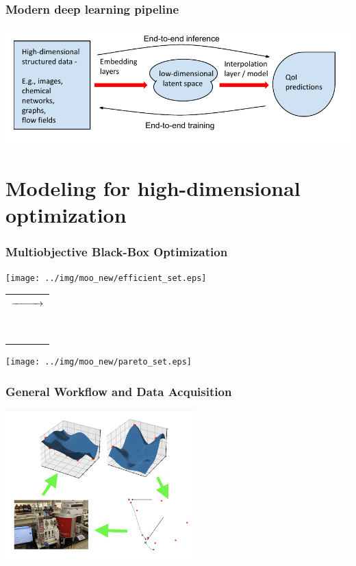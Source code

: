 \documentclass[aspectratio=169]{beamer}
\begin{document}
\begin{frame}
\frametitle{Modern deep learning pipeline}

\includegraphics{../img/delaunay_new/interpolating_latent_space.pdf}

\end{frame}

\section{Modeling for high-dimensional optimization}

\begin{frame}
\frametitle{Multiobjective Black-Box Optimization}

\begin{center}
\texttt{[image: ../img/moo\_new/efficient\_set.eps]}
\begin{tabular}{c}
 \\
 $\xrightarrow{\hspace*{1cm}}$\\
 \\
 \\
 \\
 \\
 \\
 \\
 \\
 \\
 \\
\end{tabular}
\texttt{[image: ../img/moo\_new/pareto\_set.eps]}
\end{center}

\end{frame}

\begin{frame}
\frametitle{General Workflow and Data Acquisition}

\begin{center}
\includegraphics[width=0.55\textwidth]{../img/moo_new/iclr-thumbnail.png}
\end{center}

\end{frame}
\end{document}
